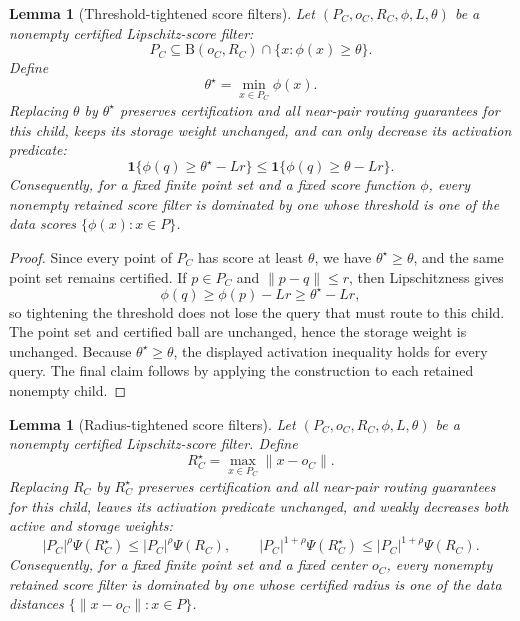 \documentclass[10pt]{article}
\newtheorem{lemma}[theorem]{Lemma}
\theoremstyle{definition}
\newcommand{\Ball}{\mathrm{B}}
\begin{document}
\begin{lemma}[Threshold-tightened score filters]
   \label{lem:threshold-tightening}
   Let $(P_C,o_C,R_C,\phi,L,\theta)$ be a nonempty certified Lipschitz-score
   filter:
   \[
      P_C\subseteq\Ball(o_C,R_C)\cap\{x:\phi(x)\ge\theta\}.
   \]
   Define
   \[
      \theta^\star=\min_{x\in P_C}\phi(x).
   \]
   Replacing $\theta$ by $\theta^\star$ preserves certification and all
   near-pair routing guarantees for this child, keeps its storage weight
   unchanged, and can only decrease its activation predicate:
   \[
      \mathbf 1\{\phi(q)\ge\theta^\star-Lr\}
      \le
      \mathbf 1\{\phi(q)\ge\theta-Lr\}.
   \]
   Consequently, for a fixed finite point set and a fixed score function
   $\phi$, every nonempty retained score filter is dominated by one whose
   threshold is one of the data scores $\{\phi(x):x\in P\}$.
\end{lemma}

\begin{proof}
   Since every point of $P_C$ has score at least $\theta$, we have
   $\theta^\star\ge\theta$, and the same point set remains certified.  If
   $p\in P_C$ and $\|p-q\|\le r$, then Lipschitzness gives
   \[
      \phi(q)\ge\phi(p)-Lr\ge\theta^\star-Lr,
   \]
   so tightening the threshold does not lose the query that must route to this
   child.  The point set and certified ball are unchanged, hence the storage
   weight is unchanged.  Because $\theta^\star\ge\theta$, the displayed
   activation inequality holds for every query.  The final claim follows by
   applying the construction to each retained nonempty child.
\end{proof}

\begin{lemma}[Radius-tightened score filters]
   \label{lem:radius-tightening}
   Let $(P_C,o_C,R_C,\phi,L,\theta)$ be a nonempty certified Lipschitz-score
   filter.  Define
   \[
      R_C^\star=\max_{x\in P_C}\|x-o_C\|.
   \]
   Replacing $R_C$ by $R_C^\star$ preserves certification and all near-pair
   routing guarantees for this child, leaves its activation predicate
   unchanged, and weakly decreases both active and storage weights:
   \[
      |P_C|^\rho\Psi(R_C^\star)\le |P_C|^\rho\Psi(R_C),
      \qquad
      |P_C|^{1+\rho}\Psi(R_C^\star)\le |P_C|^{1+\rho}\Psi(R_C).
   \]
   Consequently, for a fixed finite point set and a fixed center $o_C$, every
   nonempty retained score filter is dominated by one whose certified radius is
   one of the data distances $\{\|x-o_C\|:x\in P\}$.
\end{lemma}
\end{document}
